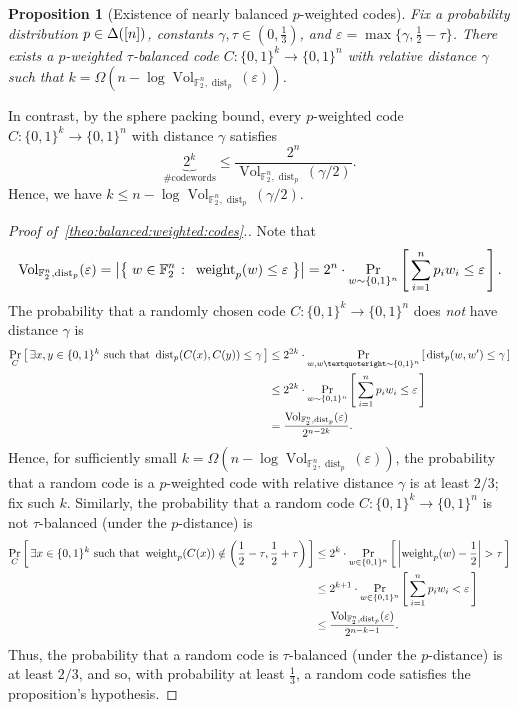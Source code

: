 \documentclass[11pt]{article}
\newtheorem{proposition}[prop]{Proposition}
\theoremstyle{remark}   	\newtheorem{remark}[theorem]{Remark}
\theoremstyle{definition}   	\newaliascnt{defn}{theorem}
\newcommand{\eps}{\ensuremath{\varepsilon}\xspace}
\newcommand{\setOfSuchThat}[2]{ \left\{\; #1 \;\colon\; #2\; \right\} } 			\newcommand{\indicSet}[1]{\mathds{1}_{#1}}                                              \newcommand{\indic}[1]{\indicSet{\left\{#1\right\}}}                                             \newcommand{\disjunion}{\amalg}
\newcommand{\proba}{\Pr}
\newcommand{\probaDistrOf}[2]{\proba_{#1}\left[\, #2\, \right]}
\newcommand{\abs}[1]{\left\lvert #1 \right\rvert}
\newcommand{\bitset}{\ensuremath{\{0,1\}}}
\newcommand{\pdistfunc}[1][p]{\operatorname{dist}_{#1}}
\newcommand{\pweightfunc}[1][p]{\operatorname{weight}_{#1}}
\newcommand{\pdist}[3][p]{\pdistfunc[#1]\mleft({#2, #3}\mright)}
\newcommand{\pweight}[2][p]{\pweightfunc[#1]\mleft({#2}\mright)}
\begin{document}
\begin{proposition}[Existence of nearly balanced $p$-weighted codes]\label{theo:balanced:weighted:codes}
  Fix a probability distribution $p\in\Delta\!\left([n]\right)$, constants $\gamma, \tau\in(0,\tfrac{1}{3})$, and $\eps = \max\{\gamma, \frac12 - \tau\}$. There exists a  $p$-weighted $\tau$-balanced code $C\colon\bitset^k\to\bitset^n$ with relative distance $\gamma$ such that $k = \Omega(n - \log \operatorname{Vol}_{\mathbb{F}_2^n,\pdistfunc[p]}(\eps))$.
\end{proposition}

In contrast, by the sphere packing bound, every $p$-weighted code $C\colon\bitset^k \to\bitset^n$ with distance $\gamma$ satisfies
\[
      \underbrace{2^k}_{\#\text{codewords}} \leq \frac{2^n}{\operatorname{Vol}_{\mathbb{F}_2^n,\pdistfunc[p]}(\gamma/2) }.
\]
Hence, we have $k \leq n - \log \operatorname{Vol}_{\mathbb{F}_2^n,\pdistfunc[p]}(\gamma/2)$.
\begin{proof}[Proof of~\autoref{theo:balanced:weighted:codes}.]
Note that
\begin{equation*}
    \operatorname{Vol}_{\mathbb{F}_2^n,\pdistfunc[p]}(\eps) 
    =\abs{ \setOfSuchThat{w\in \mathbb{F}_2^n }{ \pweight[p]{w} \leq \eps } }
    =2^n \cdot \probaDistrOf{w\sim\bitset^n}{  \sum_{i=1}^n p_i w_i \leq \eps}.
\end{equation*}
The probability that a randomly chosen code $C\colon\bitset^k\to\bitset^n$ does \emph{not} have distance $\gamma$ is
\begin{align*}
	\probaDistrOf{C}{\exists x,y \in \bitset^k \text{ such that } \pdist[p]{C(x)}{C(y)} \leq \gamma} 
	& \leq 2^{2k} \cdot \probaDistrOf{w,w’ \sim \bitset^n}{\pdist[p]{w}{w'} \leq \gamma} \\
	& \leq 2^{2k} \cdot\probaDistrOf{w\sim\bitset^n}{\sum_{i=1}^{n} p_i w_i \leq \eps} \\
	& =  \frac{\operatorname{Vol}_{\mathbb{F}_2^n,\pdistfunc[p]}(\eps)}{2^{n-2k}}.
\end{align*}
Hence, for sufficiently small $k = \Omega(n - \log \operatorname{Vol}_{\mathbb{F}_2^n,\pdistfunc[p]}(\eps))$,  the probability that a random code is a $p$-weighted code with relative distance $\gamma$ is at least $2/3$; fix such $k$. Similarly, the probability that a random code  $C\colon\bitset^k\to\bitset^n$ is not $\tau$-balanced (under the $p$-distance) is
\begin{align*}
	\probaDistrOf{C}{\exists x \in \bitset^k \text{ such that } \pweight[p]{C(x)} \notin \left(\frac{1}{2} -\tau, \frac{1}{2}+\tau\right)} 
	& \leq 2^{k} \cdot \probaDistrOf{w \in\bitset^n}{\abs{\pweight[p]{w} - \frac12} > \tau} \\
	& \leq  2^{k+1} \cdot\probaDistrOf{w\in\bitset^n}{\sum_{i=1}^{n} p_i w_i < \eps} \\
	& \leq \frac{\operatorname{Vol}_{\mathbb{F}_2^n,\pdistfunc[p]}(\eps)}{2^{n-k-1}}.
\end{align*}
Thus, the probability that a random code is $\tau$-balanced (under the $p$-distance) is at least $2/3$, and so, with probability at least $\tfrac{1}{3}$, a random code satisfies the proposition's hypothesis.
\end{proof}
\end{document}

